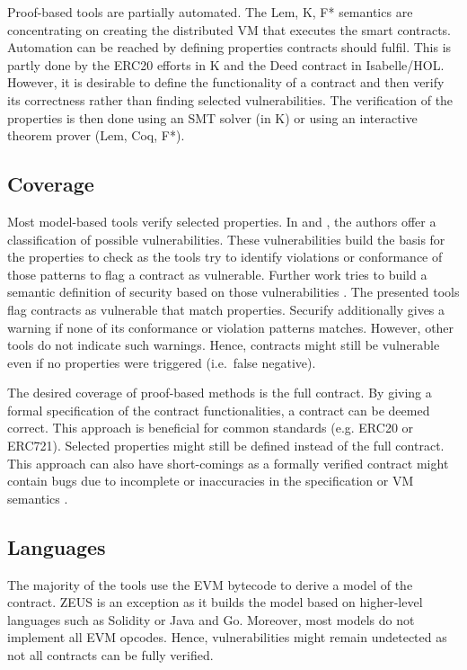 Proof-based tools are partially automated. The Lem, K, F* semantics are concentrating on creating the distributed VM that executes the smart contracts. Automation can be reached by defining properties contracts should fulfil. This is partly done by the ERC20 efforts in K and the Deed contract in Isabelle/HOL. However, it is desirable to define the functionality of a contract and then verify its correctness rather than finding selected vulnerabilities. The verification of the properties is then done using an SMT solver (in K) or using an interactive theorem prover (Lem, Coq, F*).

\subsection{Coverage} Most model-based tools verify selected properties. In \cite{Atzei2017} and \cite{Luu2016}, the authors offer a classification of possible vulnerabilities. These vulnerabilities build the basis for the properties to check as the tools try to identify violations or conformance of those patterns to flag a contract as vulnerable. Further work tries to build a semantic definition of security based on those vulnerabilities \cite{Grishchenko2018}. The presented tools flag contracts as vulnerable that match properties. Securify additionally gives a warning if none of its conformance or violation patterns matches. However, other tools do not indicate such warnings. Hence, contracts might still be vulnerable even if no properties were triggered (i.e.\ false negative).

The desired coverage of proof-based methods is the full contract. By giving a formal specification of the contract functionalities, a contract can be deemed correct. This approach is beneficial for common standards (e.g. ERC20 or ERC721). Selected properties might still be defined instead of the full contract. This approach can also have short-comings as a formally verified contract might contain bugs due to incomplete or inaccuracies in the specification or VM semantics \cite{Hirai2016}.

\subsection{Languages} 
The majority of the tools use the EVM bytecode to derive a model of the contract. ZEUS is an exception as it builds the model based on higher-level languages such as Solidity or Java and Go. Moreover, most models do not implement all EVM opcodes. Hence, vulnerabilities might remain undetected as not all contracts can be fully verified.

